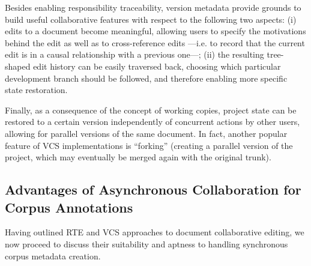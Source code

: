 \documentclass{sig-alternate}
\begin{document}
Besides enabling responsibility traceability, version metadata provide grounds to build useful
collaborative features with respect to the following two aspects: (i) edits to a document become
meaningful, allowing users to specify the motivations behind the edit as well as to cross-reference
edits ---i.e. to record that the current edit is in a causal relationship with a previous one---;
(ii) the resulting tree-shaped edit history can be easily traversed back, choosing
which particular development branch should be followed, and therefore enabling more specific
state restoration.

Finally, as a consequence of the concept of working copies, project state can be restored
to a certain version independently of concurrent actions by other users, allowing for parallel
versions of the same document. In fact, another popular feature of VCS implementations
is ``forking'' (creating a parallel version of the project, which may eventually be merged
again with the original trunk).




\subsection{Advantages of Asynchronous Collaboration for Corpus Annotations}
\label{subsec:hybrid}

Having outlined RTE and VCS approaches to document collaborative editing, we now proceed to discuss
their suitability and aptness to handling synchronous corpus metadata creation.
\end{document}
